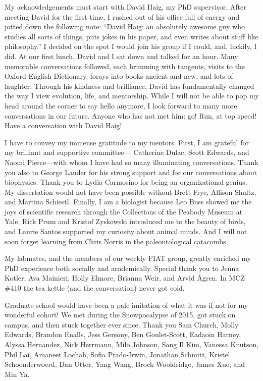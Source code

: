 My acknowledgements must start with David Haig, my PhD supervisor. After meeting David for the first time, I rushed out of his office full of energy and jotted down the following note: “David Haig: an absolutely awesome guy who studies all sorts of things, puts jokes in his paper, and even writes about stuff like philosophy.” I decided on the spot I would join his group if I could, and, luckily, I did. At our first lunch, David and I sat down and talked for an hour. Many memorable conversations followed, each brimming with tangents, visits to the Oxford English Dictionary, forays into books ancient and new, and lots of laughter. Through his kindness and brilliance, David has fundamentally changed the way I view evolution, life, and mentorship. While I will not be able to pop my head around the corner to say hello anymore, I look forward to many more conversations in our future. Anyone who has not met him: go! Run, at top speed! Have a conversation with David Haig!

I have to convey my immense gratitude to my mentors. First, I am grateful for my brilliant and supportive committee— Catherine Dulac, Scott Edwards, and Naomi Pierce—with whom I have had so many illuminating conversations. Thank you also to George Lauder for his strong support and for our conversations about biophysics. Thank you to Lydia Carmosino for being an organizational genius. My dissertation would not have been possible without Brett Frye, Allison Shultz, and Martina Schiestl. Finally, I am a biologist because Leo Buss showed me the joys of scientific research through the Collections of the Peabody Museum at Yale. Rick Prum and Kristof Zyskowski introduced me to the beauty of birds, and Laurie Santos supported my curiosity about animal minds. And I will not soon forget learning from Chris Norris in the paleontological catacombs.

My labmates, and the members of our weekly FIAT group, greatly enriched my PhD experience both socially and academically. Special thank you to Jenna Kotler, Ava Mainieri, Holly Elmore, Brianna Weir, and Arvid Ågren. In MCZ \#410 the tea kettle (and the conversation) never got cold.

Graduate school would have been a pale imitation of what it was if not for my wonderful cohort! We met during the Snowpocalypse of 2015, got stuck on campus, and then stuck together ever since. Thank you Sam Church, Molly Edwards, Brandon Enalls, Jess Gersony, Ben Goulet-Scott, Eadaoin Harney, Alyssa Hernandez, Nick Herrmann, Milo Johnson, Sang Il Kim, Vanessa Knutson, Phil Lai, Amaneet Lochab, Sofia Prado-Irwin, Jonathan Schmitt, Kristel Schoonderwoerd, Dan Utter, Yang Wang, Brock Wooldridge, James Xue, and Min Ya. 

